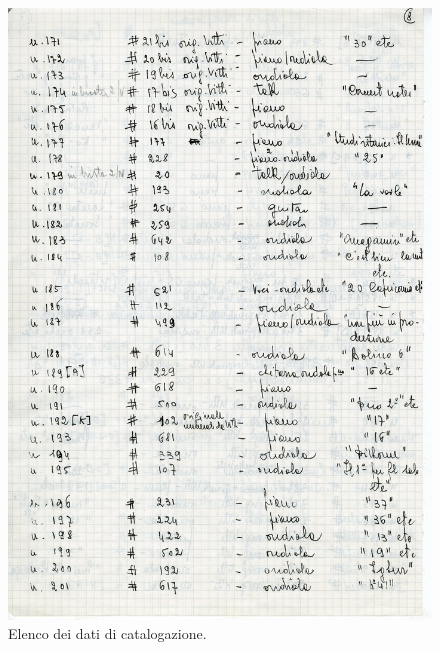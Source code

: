 \begin{figure}[H]
    \centering
    \includegraphics[width=.9\textwidth]{docs/img/elenco_dati_Boido-Uitti.jpg}
    \caption{Elenco dei dati di catalogazione.}
\end{figure}

